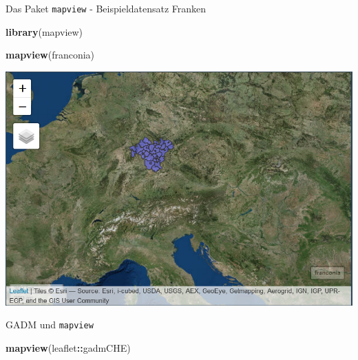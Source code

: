 \documentclass[ignorenonframetext,]{beamer}
\newenvironment{Shaded}{\begin{snugshade}}{\end{snugshade}}
\newcommand{\KeywordTok}[1]{\textcolor[rgb]{0.13,0.29,0.53}{\textbf{#1}}}
\newcommand{\NormalTok}[1]{#1}
\newcommand{\OperatorTok}[1]{\textcolor[rgb]{0.81,0.36,0.00}{\textbf{#1}}}
\begin{document}
\begin{frame}[fragile]{Das Paket \texttt{mapview} - Beispieldatensatz
Franken}
\protect\hypertarget{das-paket-mapview---beispieldatensatz-franken}{}

\begin{Shaded}
\begin{Highlighting}[]
\KeywordTok{library}\NormalTok{(mapview)}

\KeywordTok{mapview}\NormalTok{(franconia)}
\end{Highlighting}
\end{Shaded}

\includegraphics{figure/franconia.PNG}

\end{frame}

\begin{frame}[fragile]{GADM und \texttt{mapview}}
\protect\hypertarget{gadm-und-mapview}{}

\begin{Shaded}
\begin{Highlighting}[]
\KeywordTok{mapview}\NormalTok{(leaflet}\OperatorTok{::}\NormalTok{gadmCHE)}
\end{Highlighting}
\end{Shaded}

\end{frame}
\end{document}
